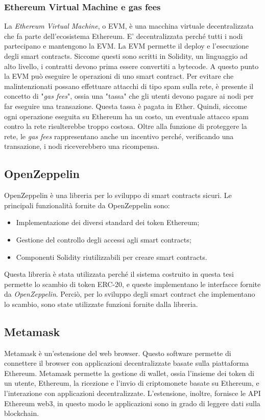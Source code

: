 \documentclass[a4paper]{article}
\begin{document}
    \subsubsection{Ethereum Virtual Machine e gas fees}
    La \emph{Ethereum Virtual Machine}, o EVM, è una macchina virtuale decentralizzata che fa parte dell'ecosistema Ethereum. E' decentralizzata perché tutti i nodi partecipano e mantengono la EVM.
    La EVM permette il deploy e l'esecuzione degli smart contracts. Siccome questi sono scritti in Solidity, un linguaggio ad alto livello, i contratti devono prima essere convertiti a bytecode. A questo punto
    la EVM può eseguire le operazioni di uno smart contract. Per evitare che malintenzionati possano effettuare attacchi di tipo spam sulla rete, è presente il concetto di "\emph{gas fees}", ossia una "tassa"
    che gli utenti devono pagare ai nodi per far eseguire una transazione. Questa tassa è pagata in Ether. Quindi, siccome ogni operazione eseguita su Ethereum ha un costo, un eventuale attacco spam contro la rete risulterebbe
    troppo costosa. Oltre alla funzione di proteggere la rete, le \emph{gas fees} rappresentano anche un incentivo perché, verificando una transazione, i nodi riceverebbero una ricompensa.

    \subsection{OpenZeppelin}
    OpenZeppelin è una libreria per lo sviluppo di smart contracts sicuri. Le principali funzionalità fornite da OpenZeppelin sono:
    \begin{itemize}
    \item Implementazione dei diversi standard dei token Ethereum;
    \item Gestione del controllo degli accessi agli smart contracts;
    \item Componenti Solidity riutilizzabili per creare smart contracts\cite{openzeppelin}.
    \end{itemize}
    Questa libreria è stata utilizzata perché il sistema costruito in questa tesi permette lo scambio di token ERC-20, e queste implementano le interfacce fornite da \emph{OpenZeppelin}.
    Perciò, per lo sviluppo degli smart contract che implementano lo scambio, sono state utilizzate funzioni fornite dalla libreria.

    \subsection{Metamask}
    Metamask è un'estensione del web browser. Questo software permette di connettere il browser con
    applicazioni decentralizzate basate sulla piattaforma Ethereum. Metamask permette la gestione di
    wallet, ossia l'insieme dei token di un utente, Ethereum, la ricezione e l'invio di criptomonete basate su Ethereum, e l'interazione con
    applicazioni decentralizzate. L'estensione, inoltre, fornisce le API Ethereum web3, in questo
    modo le applicazioni sono in grado di leggere dati sulla blockchain\cite{metamask}.
\end{document}

